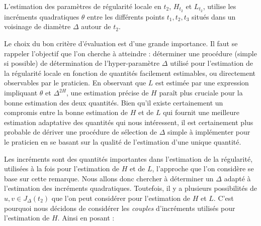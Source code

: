 

L'estimation des paramètres de régularité locale en $t_2$, $H_{t_2}$ et $L_{t_2}$, utilise les incréments quadratiques $\theta$ entre les différents points $t_1, t_2, t_3$ situés dans un voisinage de diamètre $\Delta$ autour de $t_2$.


Le choix du bon critère d'évaluation est d'une grande importance. Il faut se rappeler l'objectif que l'on cherche à atteindre : déterminer une procédure (simple si possible) de détermination de l'hyper-paramètre $\Delta$ utilisé pour l'estimation de la régularité locale en fonction de quantités facilement estimables, ou directement observables par le praticien. En observant que $L$ est estimée par une expression impliquant $\theta$ et $\Delta^{2 H}$, une estimation précise de $H$ paraît plus cruciale pour la bonne estimation des deux quantités. Bien qu'il existe certainement un compromis entre la bonne estimation de $H$ et de $L$ qui fournit une meilleure estimation adaptative des quantités qui nous intéressent, il est certainement plus probable de dériver une procédure de sélection de $\Delta$ simple à implémenter pour le praticien en se basant sur la qualité de l'estimation d'une unique quantité.


Les incréments sont des quantités importantes dans l'estimation de la régularité, utilisées à la fois pour l'estimation de $H$ et de $L$, l'approche que l'on considère se base sur cette remarque. Nous allons donc chercher à déterminer un $\Delta$ adapté à l'estimation des incréments quadratiques. Toutefois, il y a plusieurs possibilités de $u,v \in J_\Delta(t_2)$ que l'on peut considérer pour l'estimation de $H$ et $L$. C'est pourquoi nous décidons de considérer les \emph{couples} d'incréments utilisés pour l'estimation de $H$. Ainsi en posant :

